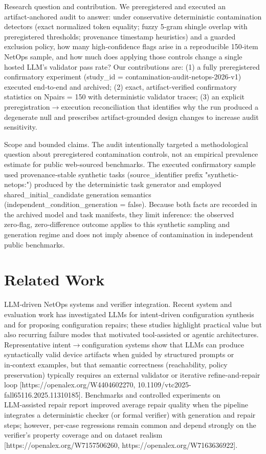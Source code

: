 \documentclass[conference]{IEEEtran}
\begin{document}
Research question and contribution. We preregistered and executed an artifact‑anchored audit to answer: under conservative deterministic contamination detectors (exact normalized token equality; fuzzy 5‑gram shingle overlap with preregistered thresholds; provenance timestamp heuristics) and a guarded exclusion policy, how many high‑confidence flags arise in a reproducible 150‑item NetOps sample, and how much does applying those controls change a single hosted LLM's validator pass rate? Our contributions are: (1) a fully preregistered confirmatory experiment (study\_id = contamination-audit-netops-2026-v1) executed end‑to‑end and archived; (2) exact, artifact‑verified confirmatory statistics on Npairs = 150 with deterministic validator traces; (3) an explicit preregistration\ensuremath{\rightarrow}execution reconciliation that identifies why the run produced a degenerate null and prescribes artifact‑grounded design changes to increase audit sensitivity.

Scope and bounded claims. The audit intentionally targeted a methodological question about preregistered contamination controls, not an empirical prevalence estimate for public web‑sourced benchmarks. The executed confirmatory sample used provenance‑stable synthetic tasks (source\_identifier prefix "synthetic-netops:") produced by the deterministic task generator and employed shared\_initial\_candidate generation semantics (independent\_condition\_generation = false). Because both facts are recorded in the archived model and task manifests, they limit inference: the observed zero‑flag, zero‑difference outcome applies to this synthetic sampling and generation regime and does not imply absence of contamination in independent public benchmarks.

\section{Related Work}
LLM‑driven NetOps systems and verifier integration. Recent system and evaluation work has investigated LLMs for intent‑driven configuration synthesis and for proposing configuration repairs; these studies highlight practical value but also recurring failure modes that motivated tool‑assisted or agentic architectures. Representative intent\ensuremath{\rightarrow}configuration systems show that LLMs can produce syntactically valid device artifacts when guided by structured prompts or in‑context examples, but that semantic correctness (reachability, policy preservation) typically requires an external validator or iterative refine‑and‑repair loop [https://openalex.org/W4404602270, 10.1109/vtc2025-fall65116.2025.11310185]. Benchmarks and controlled experiments on LLM‑assisted repair report improved average repair quality when the pipeline integrates a deterministic checker (or formal verifier) with generation and repair steps; however, per‑case regressions remain common and depend strongly on the verifier's property coverage and on dataset realism [https://openalex.org/W7157506260, https://openalex.org/W7163636922].
\end{document}
